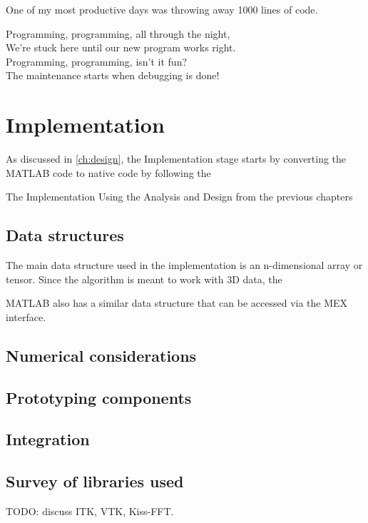 
\begin{savequote}[0.55\linewidth]
	\begin{fancyquote}
	One of my most productive days was throwing away 1000 lines of code.
	\end{fancyquote}
	\begin{fancyquote}
		Programming, programming, all through the night,\\
		We're stuck here until our new program works right.\\
		Programming, programming, isn't it fun?\\
		The maintenance starts when debugging is done!
	\end{fancyquote}
\end{savequote}
\chapter{Implementation}\label{ch:implementation}

As discussed in \cref{ch:design}, the Implementation stage
starts by converting the MATLAB code to native code by following
the 

The Implementation
Using the Analysis and Design from the previous chapters

\section{Data structures}\label{subsec:impl:ds}


The main data structure used in the implementation is an
n-dimensional array or tensor. Since the algorithm is meant to
work with 3D data, the 

MATLAB also has a similar data structure that can be accessed via the MEX interface.

\section{Numerical considerations}




\section{Prototyping components}

\section{Integration}

\section{Survey of libraries used}

TODO: discuss ITK, VTK, Kiss-FFT.



